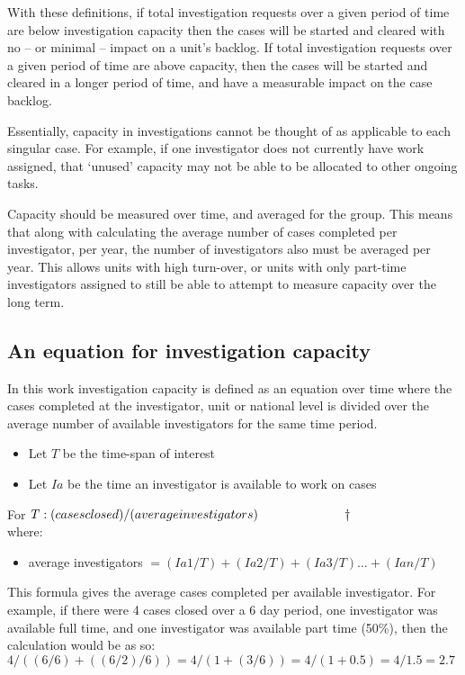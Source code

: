 \documentclass[10pt,a4paper]{article}
\begin{document}
With these definitions, if total investigation requests over a given period of time are below investigation capacity then the cases will be started and cleared with no -- or minimal -- impact on a unit's backlog. If total investigation requests over a given period of time are above capacity, then the cases will be started and cleared in a longer period of time, and have a measurable impact on the case backlog.

Essentially, capacity in investigations cannot be thought of as applicable to each singular case. For example, if one investigator does not currently have work assigned, that `unused' capacity may not be able to be allocated to other ongoing tasks.

Capacity should be measured over time, and averaged for the group. This means that along with calculating the average number of cases completed per investigator, per year, the number of investigators also must be averaged per year. This allows units with high turn-over, or units with only part-time investigators assigned to still be able to attempt to measure capacity over the long term.

\subsection{An equation for investigation capacity}
In this work investigation capacity is defined as an equation over time where the cases completed at the investigator, unit or national level is divided over the average number of available investigators for the same time period.

\begin{itemize}
\item Let $T$ be the time-span of interest
\item Let $Ia$ be the time an investigator is available to work on cases
\end{itemize}

For $T: (cases closed)/(average investigators)\hspace{.2\textwidth}\dagger$\\
\noindent where:
\begin{itemize}
\item average investigators $= (Ia1/T)+(Ia2/T)+(Ia3/T)\dots +(Ian/T)$
\end{itemize}

This formula gives the average cases completed per available investigator. For example, if there were 4 cases closed over a 6 day period, one investigator was available full time, and one investigator was available part time (50\%), then the calculation would be as so: $4/((6/6)+((6/2)/6)) = 4/(1 + (3/6)) = 4/(1+0.5) = 4/1.5 = 2.7$
\end{document}
